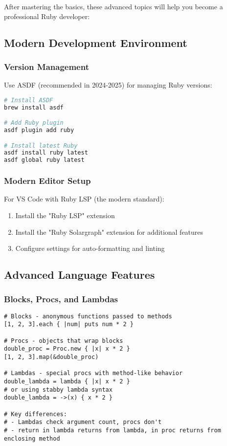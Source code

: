 \documentclass[12pt,a4paper]{article}
\begin{document}
After mastering the basics, these advanced topics will help you become a professional Ruby developer:

\subsection{Modern Development Environment}

\subsubsection{Version Management}
Use ASDF (recommended in 2024-2025) for managing Ruby versions:

\begin{lstlisting}[language=bash]
# Install ASDF
brew install asdf

# Add Ruby plugin
asdf plugin add ruby

# Install latest Ruby
asdf install ruby latest
asdf global ruby latest
\end{lstlisting}

\subsubsection{Modern Editor Setup}
For VS Code with Ruby LSP (the modern standard):

\begin{enumerate}
    \item Install the "Ruby LSP" extension
    \item Install the "Ruby Solargraph" extension for additional features
    \item Configure settings for auto-formatting and linting
\end{enumerate}

\subsection{Advanced Language Features}

\subsubsection{Blocks, Procs, and Lambdas}

\begin{lstlisting}
# Blocks - anonymous functions passed to methods
[1, 2, 3].each { |num| puts num * 2 }

# Procs - objects that wrap blocks
double_proc = Proc.new { |x| x * 2 }
[1, 2, 3].map(&double_proc)

# Lambdas - special procs with method-like behavior
double_lambda = lambda { |x| x * 2 }
# or using stabby lambda syntax
double_lambda = ->(x) { x * 2 }

# Key differences:
# - Lambdas check argument count, procs don't
# - return in lambda returns from lambda, in proc returns from enclosing method
\end{lstlisting}
\end{document}
